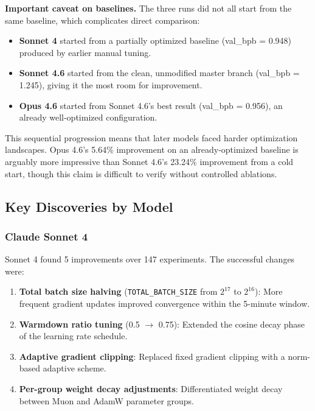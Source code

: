 \documentclass[11pt]{article}
\begin{document}
\textbf{Important caveat on baselines.} The three runs did not all start from the same baseline, which complicates direct comparison:

\begin{itemize}[leftmargin=*]
    \item \textbf{Sonnet 4} started from a partially optimized baseline (val\_bpb = 0.948) produced by earlier manual tuning.
    \item \textbf{Sonnet 4.6} started from the clean, unmodified master branch (val\_bpb = 1.245), giving it the most room for improvement.
    \item \textbf{Opus 4.6} started from Sonnet 4.6's best result (val\_bpb = 0.956), an already well-optimized configuration.
\end{itemize}

This sequential progression means that later models faced harder optimization landscapes. Opus 4.6's 5.64\% improvement on an already-optimized baseline is arguably more impressive than Sonnet 4.6's 23.24\% improvement from a cold start, though this claim is difficult to verify without controlled ablations.

\subsection{Key Discoveries by Model}
\label{sec:discoveries}

\subsubsection{Claude Sonnet 4}

Sonnet 4 found 5 improvements over 147 experiments. The successful changes were:

\begin{enumerate}[leftmargin=*]
    \item \textbf{Total batch size halving} (\texttt{TOTAL\_BATCH\_SIZE} from $2^{17}$ to $2^{16}$): More frequent gradient updates improved convergence within the 5-minute window.
    \item \textbf{Warmdown ratio tuning} (0.5 $\to$ 0.75): Extended the cosine decay phase of the learning rate schedule.
    \item \textbf{Adaptive gradient clipping}: Replaced fixed gradient clipping with a norm-based adaptive scheme.
    \item \textbf{Per-group weight decay adjustments}: Differentiated weight decay between Muon and AdamW parameter groups.
\end{enumerate}
\end{document}
